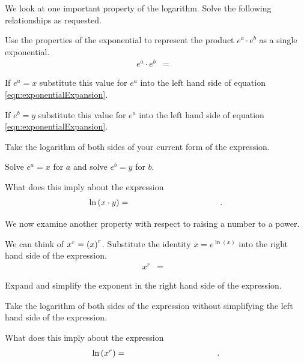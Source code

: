 \begin{problem}
\item We look at one important property of the logarithm. Solve the
  following relationships as requested.
  \begin{subproblem}
  \item Use the properties of the exponential to represent the product
    $e^a\cdot e^b$ as a single exponential.
    \label{subprob:exponentialExpansion}
    \begin{eqnarray}
      \label{eqn:exponentialExpansion}
      e^a \cdot e^b & = & 
    \end{eqnarray}
  \item If $e^a=x$ substitute this value for $e^a$ into the left hand
    side of equation \ref{eqn:exponentialExpansion}.
    \vspace{4em}
  \item If $e^b=y$ substitute this value for $e^a$ into the left hand
    side of equation \ref{eqn:exponentialExpansion}.
    \vspace{4em}
  \item Take the logarithm of both sides of your current form of the expression.
    \vfill
  \item Solve $e^a=x$ for $a$ and solve $e^b=y$ for $b$.
    \vfill
  \item What does this imply about the expression 
    \begin{eqnarray*}
      \ln\lp x \cdot y \rp & = & \hspace{10em}.
    \end{eqnarray*}
  \end{subproblem}

  \clearpage

\item We now examine another property with respect to raising a number
  to a power.
  \begin{subproblem}
  \item We can think of $x^r=\left( x \right)^r$. Substitute the identity
    $x=e^{\ln(x)}$ into the right hand side of the expression.
    \begin{eqnarray}
      \label{eqn:exponentialMultiplication}
      x^r & = & 
    \end{eqnarray}
    \item Expand and simplify the exponent in the right hand side of
      the expression.
      \vfill
    \item Take the logarithm of both sides of the expression without
      simplifying the left hand side of the expression.
      \vfill
    \item What does this imply about the expression
    \begin{eqnarray*}
      \ln\lp x^r \rp & = & \hspace{10em}.
    \end{eqnarray*}
  \end{subproblem}


\end{problem}
